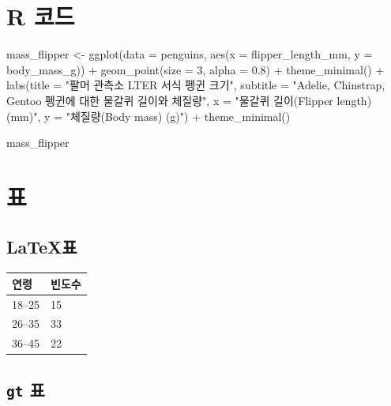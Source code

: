 \documentclass[
  a4paper,
]{report}
\newenvironment{Shaded}{\begin{snugshade}}{\end{snugshade}}
\newcommand{\AttributeTok}[1]{\textcolor[rgb]{0.40,0.45,0.13}{#1}}
\newcommand{\DecValTok}[1]{\textcolor[rgb]{0.68,0.00,0.00}{#1}}
\newcommand{\FloatTok}[1]{\textcolor[rgb]{0.68,0.00,0.00}{#1}}
\newcommand{\FunctionTok}[1]{\textcolor[rgb]{0.28,0.35,0.67}{#1}}
\newcommand{\NormalTok}[1]{\textcolor[rgb]{0.00,0.23,0.31}{#1}}
\newcommand{\OtherTok}[1]{\textcolor[rgb]{0.00,0.23,0.31}{#1}}
\newcommand{\SpecialCharTok}[1]{\textcolor[rgb]{0.37,0.37,0.37}{#1}}
\newcommand{\StringTok}[1]{\textcolor[rgb]{0.13,0.47,0.30}{#1}}
\begin{document}
\hypertarget{r-uxcf54uxb4dc}{%
\chapter{R 코드}\label{r-uxcf54uxb4dc}}

\begin{Shaded}
\begin{Highlighting}[]
\NormalTok{mass\_flipper }\OtherTok{\textless{}{-}} \FunctionTok{ggplot}\NormalTok{(}\AttributeTok{data =}\NormalTok{ penguins,}
                       \FunctionTok{aes}\NormalTok{(}\AttributeTok{x =}\NormalTok{ flipper\_length\_mm,}
                           \AttributeTok{y =}\NormalTok{ body\_mass\_g)) }\SpecialCharTok{+}
  \FunctionTok{geom\_point}\NormalTok{(}\AttributeTok{size =} \DecValTok{3}\NormalTok{,}
             \AttributeTok{alpha =} \FloatTok{0.8}\NormalTok{) }\SpecialCharTok{+}
  \FunctionTok{theme\_minimal}\NormalTok{() }\SpecialCharTok{+}
  \FunctionTok{labs}\NormalTok{(}\AttributeTok{title =} \StringTok{"팔머 관측소 LTER 서식 펭귄 크기"}\NormalTok{,}
       \AttributeTok{subtitle =} \StringTok{"Adelie, Chinstrap, Gentoo 펭귄에 대한 물갈퀴 길이와 체질량"}\NormalTok{,}
       \AttributeTok{x =} \StringTok{"물갈퀴 길이(Flipper length) (mm)"}\NormalTok{,}
       \AttributeTok{y =} \StringTok{"체질량(Body mass) (g)"}\NormalTok{) }\SpecialCharTok{+}
  \FunctionTok{theme\_minimal}\NormalTok{()}

\NormalTok{mass\_flipper}
\end{Highlighting}
\end{Shaded}

\hypertarget{uxd45c}{%
\chapter{표}\label{uxd45c}}

\hypertarget{uxd45c-1}{%
\section{\texorpdfstring{\LaTeX 표}{표}}\label{uxd45c-1}}

\begin{tabular}{|l|l|}\hline
연령 & 빈도수 \\ \hline
18--25  & 15 \\
26--35  & 33 \\
36--45  & 22 \\ \hline
\end{tabular}

\hypertarget{gt-uxd45c}{%
\section{\texorpdfstring{\texttt{gt} 표}{gt 표}}\label{gt-uxd45c}}
\end{document}

